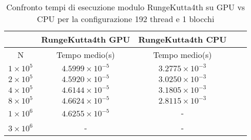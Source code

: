 \begin{table}[ht!]
    \begin{center}
        \renewcommand{\arraystretch}{1.5}
        \begin{adjustbox}{width=.51\textwidth}
            \begin{tabular}{ |c|c|c|c|c| }
                \hline
                \multicolumn{1}{|c}{} & \multicolumn{1}{|c}{RungeKutta4th GPU} & \multicolumn{1}{|c|}{RungeKutta4th CPU} \\
                \hline
                 N & Tempo medio(s) & Tempo medio(s) \\
                \hline 
                $1 \times 10^5$ & $4.5999 \times 10^{-5}$ & $3.2775 \times 10^{-3}$ \\ 
                \hline 
                $2 \times 10^5$ & $4.5920 \times 10^{-5}$ & $3.0250 \times 10^{-3}$ \\ 
                \hline 
                $4 \times 10^5$ & $4.6144 \times 10^{-5}$ & $3.1805 \times 10^{-3}$ \\ 
                \hline
                $8 \times 10^5$ & $4.6624 \times 10^{-5}$ & $2.8115 \times 10^{-3}$ \\ 
                \hline 
                $1 \times 10^6$ & $4.6255 \times 10^{-5}$ & - \\ 
                \hline 
                $3 \times 10^6$ & - & - \\ 
                \hline 
            \end{tabular}
        \end{adjustbox}
    \end{center}
    \caption{Confronto tempi di esecuzione modulo RungeKutta4th su GPU vs CPU per la configurazione 192 thread e 1 blocchi}
    \label{tab:rk4_kernel_table_192x1}
\end{table}

